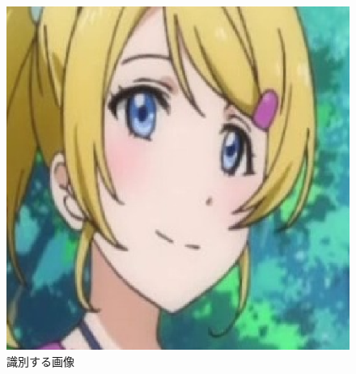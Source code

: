 \documentclass[a4paper,10pt]{jsarticle}
\begin{document}
\begin{figure}[tb]
 \begin{center}
  \includegraphics[clip,width=12cm]{./fig/eps/eri.eps}
 \end{center}
 \caption{識別する画像}
 \label{eri}
\end{figure}
\end{document}
